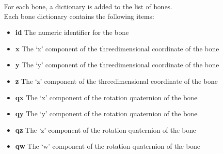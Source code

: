 For each bone, a dictionary is added to the list of bones.\\

Each bone dictionary contains the following items:
\begin{itemize}
\item \textbf{id} \longDash{} The numeric identifier for the bone
\item\exSp\textbf{x} \longDash{} The `x' component of the three\longDash{}dimensional
coordinate of the bone
\item\exSp\textbf{y} \longDash{} The `y' component of the three\longDash{}dimensional
coordinate of the bone
\item\exSp\textbf{z} \longDash{} The `z' component of the three\longDash{}dimensional
coordinate of the bone
\item\exSp\textbf{qx} \longDash{} The `x' component of the rotation quaternion of the bone
\item\exSp\textbf{qy} \longDash{} The `y' component of the rotation quaternion of the bone
\item\exSp\textbf{qz} \longDash{} The `z' component of the rotation quaternion of the bone
\item\exSp\textbf{qw} \longDash{} The `w' component of the rotation quaternion of the bone
\end{itemize}
\appendixEnd{}
